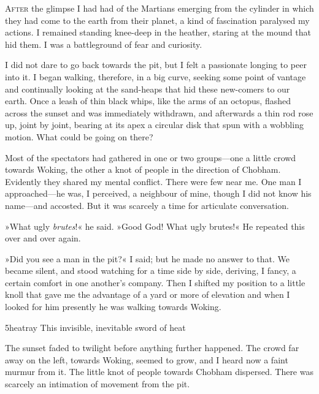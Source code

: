 

\lettrine[lines=4,findent=2pt]{A}{fter} the glimpse I had had of the Martians emerging from the cylinder in which they had come to the earth from their planet, a kind of fascination paralysed my actions. I remained standing knee-deep in the heather, staring at the mound that hid them. I was a battleground of fear and curiosity.

I did not dare to go back towards the pit, but I felt a passionate longing to peer into it. I began walking, therefore, in a big curve, seeking some point of vantage and continually looking at the sand-heaps that hid these new-comers to our earth. Once a leash of thin black whips, like the arms of an octopus, flashed across the sunset and was immediately withdrawn, and afterwards a thin rod rose up, joint by joint, bearing at its apex a circular disk that spun with a wobbling motion. What could be going on there?

Most of the spectators had gathered in one or two groups—one a little crowd towards Woking, the other a knot of people in the direction of Chobham. Evidently they shared my mental conflict. There were few near me. One man I approached—he was, I perceived, a neighbour of mine, though I did not know his name—and accosted. But it was scarcely a time for articulate conversation.

»What ugly \textit{brutes}!« he said. »Good God! What ugly brutes!« He repeated this over and over again.

»Did you see a man in the pit?« I said; but he made no answer to that. We became silent, and stood watching for a time side by side, deriving, I fancy, a certain comfort in one another's company. Then I shifted my position to a little knoll that gave me the advantage of a yard or more of elevation and when I looked for him presently he was walking towards Woking.


\begin{bwbigpic}
	[1.2] 
	{5heatray} 
	{This invisible, inevitable sword of heat} 
\end{bwbigpic}

The sunset faded to twilight before anything further happened. The crowd far away on the left, towards Woking, seemed to grow, and I heard now a faint murmur from it. The little knot of people towards Chobham dispersed. There was scarcely an intimation of movement from the pit.

